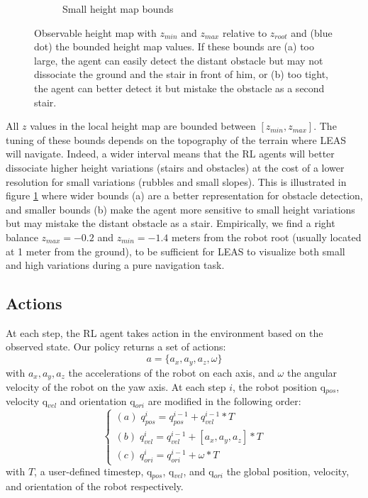 \begin{figure}
\begin{subfigure}[t]{.49\linewidth}
    \caption{Small height map bounds}
    \end{subfigure}
    \caption{Observable height map with $z_{min}$ and  $z_{max}$ relative to $z_{root}$ and (blue dot) the bounded height map values. If these bounds are (a) too large, the agent can easily detect the distant obstacle but may not dissociate the ground and the stair in front of him, or (b) too tight, the agent can better detect it but mistake the obstacle as a second stair.}
    \label{fig:height map_bounds}
\end{figure}

All $z$ values in the local height map are bounded between $[z_{min}, z_{max}]$. 
The tuning of these bounds depends on the topography of the terrain where LEAS will navigate. 
Indeed, a wider interval means that the RL agents will better dissociate higher height variations (stairs and obstacles) at the cost of a lower resolution for small variations (rubbles and small slopes).
This is illustrated in figure \ref{fig:height map_bounds} where wider bounds (a) are a better representation for obstacle detection, and smaller bounds (b) make the agent more sensitive to small height variations but may mistake the distant obstacle as a stair. 
Empirically, we find a right balance $z_{max}= -0.2$ and $z_{min}= -1.4$ meters from the robot root (usually located at 1 meter from the ground), to be sufficient for LEAS to visualize both small and high variations during a pure navigation task.

\subsection{Actions\label{subsubsec:actions}}
At each step, the RL agent takes action in the environment based on the observed state. 
Our policy returns a set of actions: 
\begin{equation}
a = \{ a_x, a_y, a_z, \omega \}
\end{equation}
with $a_x, a_y, a_z$ the accelerations of the robot on each axis, and $\omega$ the angular velocity of the robot on the yaw axis. At each step $i$, the robot position q$_{pos}$, velocity q$_{vel}$ and orientation q$_{ori}$ are modified in the following order:
\begin{equation}
\begin{cases}
(a) \; q_{pos}^i = q_{pos}^{i-1} + q_{vel}^{i-1} * T \\

(b) \; q_{vel}^i = q_{vel}^{i-1} + [a_x, a_y, a_z] * T \\

(c) \; q_{ori}^i = q_{ori}^{i-1} + \omega * T 
\end{cases}
\end{equation}
with $T$, a user-defined timestep, q$_{pos}$, q$_{vel}$, and q$_{ori}$ the global position, velocity, and orientation of the robot respectively.

